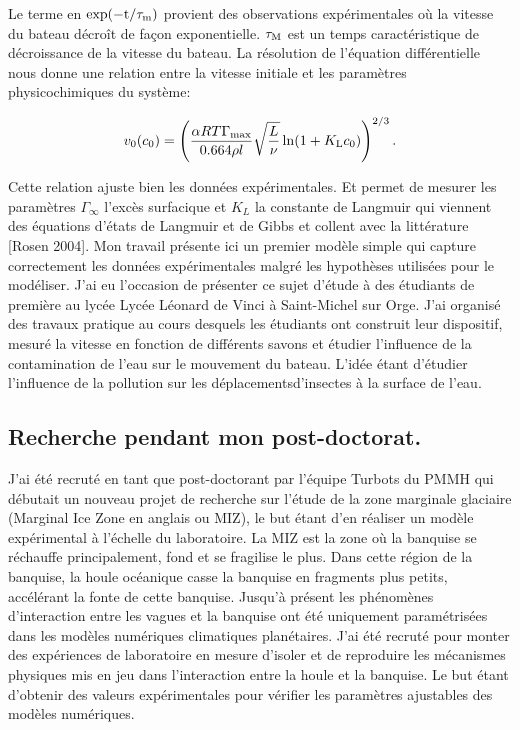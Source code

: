 \documentclass[french, 10pt]{article}
\begin{document}
Le terme en $\rm exp(-t/\tau_m)$ provient des observations expérimentales où la vitesse du bateau décroît de façon exponentielle. $\tau_{\rm M}$ est un temps caractéristique de décroissance de la vitesse du bateau. La résolution de l'équation différentielle nous donne une relation entre la vitesse initiale et les paramètres physicochimiques du système:

\begin{equation}
  v_0(c_0)=\left(\frac{\alpha RT\Gamma_{\rm max}}{0.664\rho l}\sqrt{\frac{L}{\nu}}\ln(1+K_{\rm L}c_0)\right)^{2/3}.
  \label{eqn:v0}
\end{equation}

Cette relation ajuste bien les données expérimentales. Et permet de mesurer les paramètres $\Gamma_\infty$ l'excès surfacique et $K_L$ la constante de Langmuir qui viennent des équations d'états de Langmuir et de Gibbs et collent avec la littérature [Rosen 2004]. Mon travail présente ici un premier modèle simple qui capture correctement les données expérimentales malgré les hypothèses utilisées pour le modéliser. J'ai eu l'occasion de présenter ce sujet d'étude à des étudiants de première au lycée Lycée Léonard de Vinci à Saint-Michel sur Orge. J'ai organisé des travaux pratique au cours desquels les étudiants ont construit leur dispositif, mesuré la vitesse en fonction de différents savons et étudier l'influence de la contamination de l'eau sur le mouvement du bateau. L'idée étant d'étudier l'influence de la pollution sur les déplacementsd'insectes à la surface de l'eau.

\subsection{Recherche pendant mon post-doctorat.}

J'ai été recruté en tant que post-doctorant par l'équipe Turbots du PMMH qui débutait un nouveau projet de recherche sur l'étude de la zone marginale glaciaire (Marginal Ice Zone en anglais ou MIZ), le but étant d'en réaliser un modèle expérimental à l'échelle du laboratoire. La MIZ est la zone où la banquise se réchauffe principalement, fond et se fragilise le plus. Dans cette région de la banquise, la houle océanique casse la banquise en fragments plus petits, accélérant la fonte de cette banquise. Jusqu'à présent les phénomènes d'interaction entre les vagues et la banquise ont été uniquement paramétrisées dans les modèles numériques climatiques planétaires. J'ai été recruté pour monter des expériences de laboratoire en mesure d'isoler et de reproduire les mécanismes physiques mis en jeu dans l'interaction entre la houle et la banquise. Le but étant d'obtenir des valeurs expérimentales pour vérifier les paramètres ajustables des modèles numériques.\medskip
\end{document}
